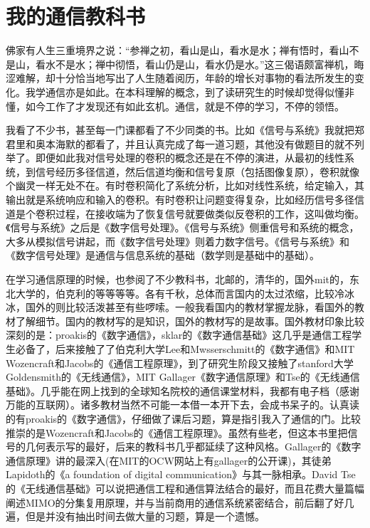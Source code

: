 \documentclass[10pt,a4paper,UTF8]{article}
\begin{document}
\section{我的通信教科书}
\label{sec:orgheadline4}



佛家有人生三重境界之说：“参禅之初，看山是山，看水是水；禅有悟时，看山不是山，看水不是水；禅中彻悟，看山仍是山，看水仍是水。”这三偈语颇富禅机，晦涩难解，却十分恰当地写出了人生随着阅历，年龄的增长对事物的看法所发生的变化。我学通信亦是如此。在本科理解的概念，到了读研究生的时候却觉得似懂非懂，如今工作了才发现还有如此玄机。通信，就是不停的学习，不停的领悟。

我看了不少书，甚至每一门课都看了不少同类的书。比如《信号与系统》我就把郑君里和奥本海默的都看了，并且认真完成了每一道习题，其他没有做题目的就不列举了。即便如此我对信号处理的卷积的概念还是在不停的演进，从最初的线性系统，到信号经历多径信道，然后信道均衡和信号复原（包括图像复原），卷积就像个幽灵一样无处不在。有时卷积简化了系统分析，比如对线性系统，给定输入，其输出就是系统响应和输入的卷积。有时卷积让问题变得复杂，比如经历信号多径信道是个卷积过程，在接收端为了恢复信号就要做类似反卷积的工作，这叫做均衡。《信号与系统》之后是《数字信号处理》。《信号与系统》侧重信号和系统的概念，大多从模拟信号讲起，而《数字信号处理》则着力数字信号。《信号与系统》和《数字信号处理》是通信与信息系统的基础（数学则是基础中的基础）。

在学习通信原理的时候，也参阅了不少教科书，北邮的，清华的，国外mit的，东北大学的，伯克利的等等等等。各有千秋，总体而言国内的太过浓缩，比较冷冰冰，国外的则比较活泼甚至有些啰嗦。一般我看国内的教材掌握龙脉，看国外的教材了解细节。国内的教材写的是知识，国外的教材写的是故事。国外教材印象比较深刻的是：proakis的《数字通信》，sklar的《数字通信基础》这几乎是通信工程学生必备了，后来接触了了伯克利大学Lee和Mwsserschmitt的《数字通信》和MIT Wozencraft和Jacobs的《通信工程原理》，到了研究生阶段又接触了stanford大学Goldensmith的《无线通信》，MIT Gallager《数字通信原理》和Tse的《无线通信基础》。几乎能在网上找到的全球知名院校的通信课堂材料，我都有电子档（感谢万能的互联网）。诸多教材当然不可能一本借一本开下去，会成书呆子的。认真读的有proakis的《数字通信》，仔细做了课后习题，算是指引我入了通信的门。比较推崇的是Wozencraft和Jacobs的《通信工程原理》。虽然有些老，但这本书里把信号的几何表示写的最好，后来的教科书几乎都延续了这种风格。Gallager的《数字通信原理》讲的最深入(在MIT的OCW网站上有gallager的公开课)，其徒弟Lapidoth的《a foundation of digital communication》与其一脉相承。David Tse的《无线通信基础》可以说把通信工程和通信算法结合的最好，而且花费大量篇幅阐述MIMO的分集复用原理，并与当前商用的通信系统紧密结合，前后翻了好几遍，但是并没有抽出时间去做大量的习题，算是一个遗憾。
\end{document}
